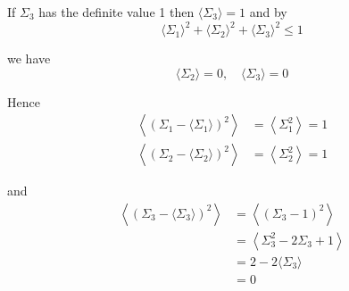 


\bigskip
If $\Sigma_3$ has the definite value 1 then $\langle\Sigma_3\rangle=1$ and by
\begin{equation*}
\langle\Sigma_1\rangle^2+\langle\Sigma_2\rangle^2+\langle\Sigma_3\rangle^2\le1
\end{equation*}

we have
\begin{equation*}
\langle\Sigma_2\rangle=0,\quad\langle\Sigma_3\rangle=0
\end{equation*}

Hence
\begin{align*}
\left\langle(\Sigma_1-\langle\Sigma_1\rangle)^2\right\rangle
&=\left\langle\Sigma_1^2\right\rangle=1
\\
\left\langle(\Sigma_2-\langle\Sigma_2\rangle)^2\right\rangle
&=\left\langle\Sigma_2^2\right\rangle=1
\end{align*}

and
\begin{align*}
\left\langle(\Sigma_3-\langle\Sigma_3\rangle)^2\right\rangle
&=\left\langle(\Sigma_3-1)^2\right\rangle
\\
&=\left\langle\Sigma_3^2-2\Sigma_3+1\right\rangle
\\
&=2-2\langle\Sigma_3\rangle
\\
&=0
\end{align*}


